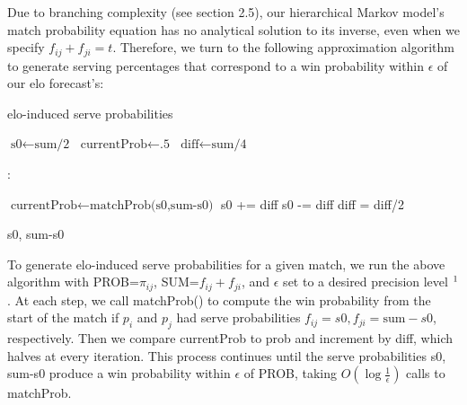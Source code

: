 \documentclass[chapterprefix=false]{report}
\begin{document}
Due to branching complexity (see section 2.5), our hierarchical Markov model's match probability equation has no analytical solution to its inverse, even when we specify $f_{ij}+f_{ji}=t$. Therefore, we turn to the following approximation algorithm to generate serving percentages that correspond to a win probability within $\epsilon$ of our elo forecast's:

\begin{algorithm}
\caption{elo-induced serve probabilities}\label{euclid}
\begin{algorithmic}[1]
\State $\text{s0} \gets \text{sum/2}$
\State $\text{currentProb} \gets \text{.5}$
\State $\text{diff} \gets \text{sum/4}$

:

\State $\text{currentProb} \gets \text{matchProb(s0,sum-s0)}$
\State s0 += diff 
\Else
\State s0 -= diff
\EndIf
\State diff = diff/2

\EndWhile


\State \Return s0, sum-s0

\EndProcedure
\end{algorithmic}
\end{algorithm}

To generate elo-induced serve probabilities for a given match, we run the above algorithm with PROB=$\pi_{ij}$, SUM=$f_{ij}+f_{ji}$, and $\epsilon$ set to a desired precision level $\footnote{for purposes of this project, setting $epsilon$=.001 is sufficiently accurate}$. At each step, we call matchProb() to compute the win probability from the start of the match if $p_i$ and $p_j$ had serve probabilities $f_{ij}=s0, f_{ji}=\text{sum}-s0$, respectively. Then we compare currentProb to prob and increment by diff, which halves at every iteration. This process continues until the serve probabilities s0, sum-s0 produce a win probability within $\epsilon$ of PROB, taking $O(\log{\frac{1}{\epsilon}})$ calls to matchProb.
\end{document}
